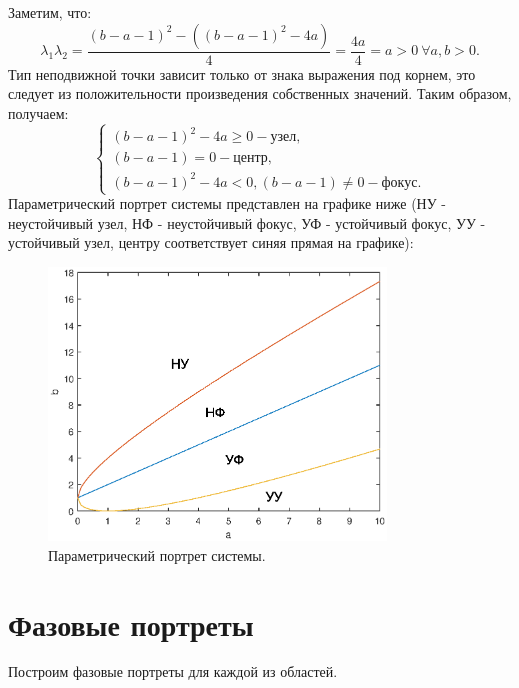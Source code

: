 \documentclass[12pt]{article}
\begin{document}
Заметим, что:
$$
    \lambda_1\lambda_2 = \frac{(b - a - 1)^2 - ((b - a - 1)^2 - 4a)}{4} = \frac{4a}{4} = a > 0 ~\forall a,b>0.
$$
Тип неподвижной точки зависит только от знака выражения под корнем, это следует из положительности произведения собственных значений. Таким образом, получаем:
\begin{equation}
    \begin{cases}
        (b - a - 1)^2 - 4a \geqslant 0 - \text{узел},\\
        (b - a - 1) = 0 - \text{центр},\\
        (b - a - 1)^2 - 4a < 0, (b - a - 1) \neq 0 - \text{фокус}.
    \end{cases}
\end{equation}
Параметрический портрет системы представлен на графике ниже (НУ - неустойчивый узел, НФ - неустойчивый фокус, УФ - устойчивый фокус, УУ - устойчивый узел, центру соответствует синяя прямая на графике):
\begin{figure} [H]
    \begin{center}
    \includegraphics[width=0.8\textwidth]{paramport.eps}
    \caption{Параметрический портрет системы.}
    \label{pic1}
    \end{center}
\end{figure}

\newpage
\section{Фазовые портреты}
Построим фазовые портреты для каждой из областей.
\end{document}
